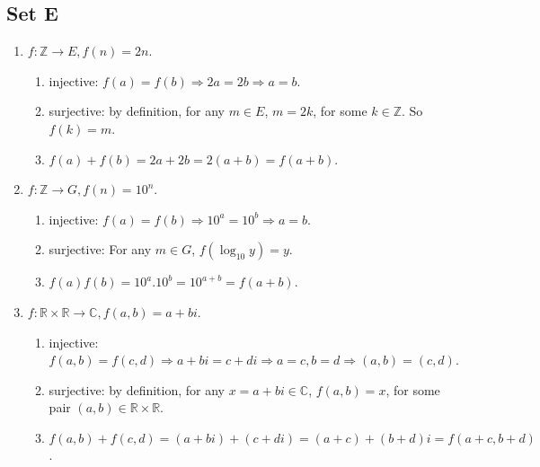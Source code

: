 \subsection{Set E}
\begin{enumerate}
    \item $ f: \mathbb{Z} \to E, f(n) = 2n $.
        \begin{enumerate}
    
            \item injective: $ f(a) = f(b) \Rightarrow 2a = 2b \Rightarrow a = b $.
    
            \item surjective: by definition, for any $ m \in E $, $ m = 2k $, for some $ k \in \mathbb{Z} $. So $ f(k) = m $.
    
            \item $ f(a) + f(b) = 2a + 2b = 2(a + b) = f(a + b) $.
        \end{enumerate}
    
    \item $ f: \mathbb{Z} \to G, f(n) = 10^n $.
        \begin{enumerate}
    
            \item injective: $ f(a) = f(b) \Rightarrow 10^a = 10^b \Rightarrow a = b $.
    
            \item surjective: For any $ m \in G $, $ f(\log_{10} y) = y $.
    
            \item $ f(a)f(b) = 10^a.10^b = 10^{a + b} = f(a + b) $.
        \end{enumerate}
    
    \item $ f: \mathbb{R} \times \mathbb{R} \to \mathbb{C}, f(a, b) = a + bi $.
        \begin{enumerate}
            \item injective: $ f(a, b) = f(c, d) \Rightarrow a + bi = c + di \Rightarrow a = c, b = d \Rightarrow (a, b) = (c, d) $.

            \item surjective: by definition, for any $ x = a + bi \in \mathbb{C} $, $ f(a, b) = x $, for some pair $ (a, b) \in \mathbb{R} \times \mathbb{R}$.

            \item $ f(a, b) + f(c, d) = (a + bi) + (c + di) = (a + c) + (b + d)i = f(a + c, b + d) $.
        \end{enumerate}


\end{enumerate}
